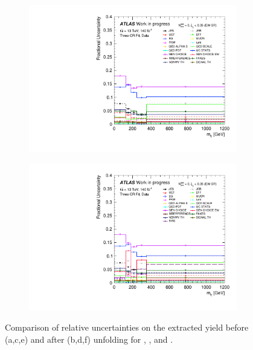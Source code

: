 \begin{figure}[t]
\begin{subfigure}[b]{0.48\textwidth}
    \includegraphics[width=\textwidth]{plots/diffx/final/data/3cr/Systematic_Uncertainties_data_ly_m_3cr_QCD_Sh2211_0p01sigma.pdf}
    \caption{}
\end{subfigure}
\hfill
\begin{subfigure}[b]{0.48\textwidth}
    \centering
    \includegraphics[width=\textwidth]{plots/diffx/final/unfolded/3cr/Systematic_Uncertainties_data_unfolded_ly_m_3cr_QCD_Sh2211_0p01sigma.pdf}
    \caption{}
\end{subfigure}
\caption{Comparison of relative uncertainties on the extracted \ewwy yield before (a,c,e) and after (b,d,f) unfolding for \leppt, \lepgamdphi, and \lym.\label{fig:vbswy:unfcomp2}}
\end{figure}


